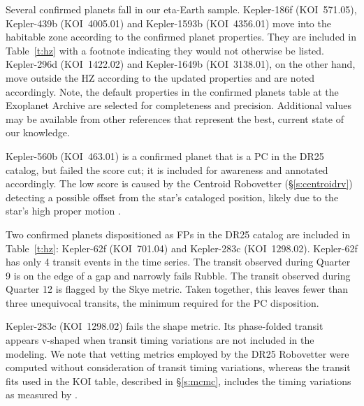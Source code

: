 Several confirmed planets fall in our eta-Earth sample.  Kepler-186f (KOI~571.05), Kepler-439b (KOI~4005.01) and Kepler-1593b (KOI~4356.01) move into the habitable zone according to the confirmed planet properties. They are included in Table~\ref{t:hz} with a footnote indicating they would not otherwise be listed. Kepler-296d (KOI~1422.02) and Kepler-1649b (KOI~3138.01), on the other hand, move outside the HZ according to the updated properties and are noted accordingly. Note, the default properties in the confirmed planets table at the Exoplanet Archive are selected for completeness and precision. Additional values may be available from other references that represent the best, current state of our knowledge.

Kepler-560b (KOI~463.01) is a confirmed planet that is a PC in the DR25 catalog, but failed the score cut; it is included for awareness and annotated accordingly.  The low score is caused by the Centroid Robovetter (\S\ref{s:centroidrv}) detecting a possible offset from the star's cataloged position, likely due to the star's high proper motion \citep{Mann2017}.  

Two confirmed planets dispositioned as FPs in the DR25 catalog are included in Table~\ref{t:hz}: Kepler-62f (KOI~701.04) and Kepler-283c (KOI~1298.02).  Kepler-62f has only 4 transit events in the time series.  The transit observed during Quarter 9 is on the edge of a gap and narrowly fails Rubble.  The transit observed during Quarter 12 is flagged by the Skye metric.  Taken together, this leaves fewer than three unequivocal transits, the minimum required for the PC disposition. 

Kepler-283c (KOI~1298.02) fails the shape metric.  Its phase-folded transit appears v-shaped when transit timing variations are not included in the modeling.  We note that vetting metrics employed by the DR25 Robovetter were computed without consideration of transit timing variations, whereas the transit fits used in the KOI table, described in \S\ref{s:mcmc}, includes the timing variations as measured by \citet{Rowe2015cat}. 




